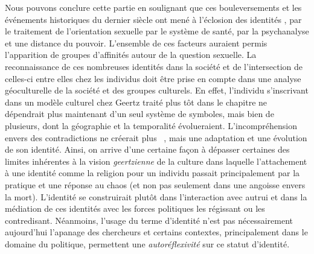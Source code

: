 Nous pouvons conclure cette partie en soulignant que ces bouleversements et les événements historiques du dernier siècle ont mené à l'éclosion des identités \lgbt{}, par le traitement de l'orientation sexuelle par le système de santé, par la psychanalyse et une distance du pouvoir.
L'ensemble de ces facteurs auraient permis l'apparition de groupes d'affinités autour de la question sexuelle.
La reconnaissance de ces nombreuses identités dans la société et de l'intersection de celles-ci entre elles chez les individus doit être prise en compte dans une analyse géoculturelle de la société et des groupes culturels.
En effet, l'individu s'inscrivant dans un modèle culturel chez Geertz traité plus tôt dans le chapitre ne dépendrait plus maintenant d'un seul système de symboles, mais bien de plusieurs, dont la géographie et la temporalité évolueraient.
L'incompréhension envers des contradictions ne créerait plus ~\citep[33]{Geertz1972}, mais une adaptation et une évolution de son identité.
Ainsi, on arrive d'une certaine façon à dépasser certaines des limites inhérentes à la vision \emph{geertzienne} de la culture dans laquelle l'attachement à une identité comme la religion pour un individu passait principalement par la pratique et une réponse au chaos (et non pas seulement dans une angoisse envers la mort).
L'identité se construirait plutôt dans l'interaction avec autrui et dans la médiation de ces identités avec les forces politiques les régissant ou les contredisant.
Néanmoins, l'usage du terme d'identité n'est pas nécessairement aujourd'hui l'apanage des chercheurs et certains contextes, principalement dans le domaine du politique, permettent une \emph{autoréflexivité} sur ce statut d'identité.


